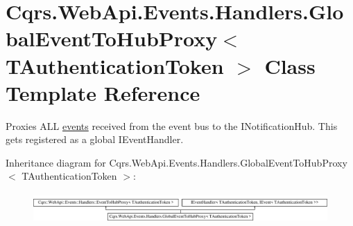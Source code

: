 \hypertarget{classCqrs_1_1WebApi_1_1Events_1_1Handlers_1_1GlobalEventToHubProxy}{}\section{Cqrs.\+Web\+Api.\+Events.\+Handlers.\+Global\+Event\+To\+Hub\+Proxy$<$ T\+Authentication\+Token $>$ Class Template Reference}
\label{classCqrs_1_1WebApi_1_1Events_1_1Handlers_1_1GlobalEventToHubProxy}


Proxies A\+LL \hyperlink{}{events} received from the event bus to the I\+Notification\+Hub. This gets registered as a global I\+Event\+Handler.  


Inheritance diagram for Cqrs.\+Web\+Api.\+Events.\+Handlers.\+Global\+Event\+To\+Hub\+Proxy$<$ T\+Authentication\+Token $>$\+:\begin{figure}[H]
\begin{center}
\leavevmode
\includegraphics[height=1.171548cm]{classCqrs_1_1WebApi_1_1Events_1_1Handlers_1_1GlobalEventToHubProxy}
\end{center}
\end{figure}
